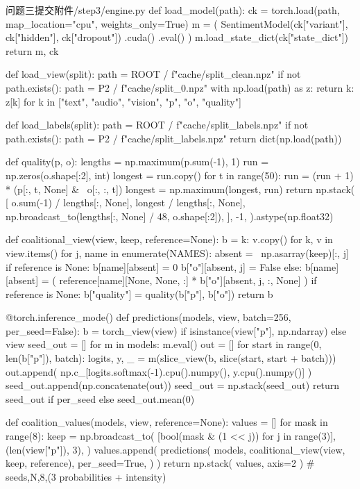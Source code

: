 \begin{appendices}
\begin{Python}{问题三提交附件/step3/engine.py}
def load_model(path):
    ck = torch.load(path, map_location="cpu", weights_only=True)
    m = (
        SentimentModel(ck["variant"], ck["hidden"], ck["dropout"])
        .cuda()
        .eval()
    )
    m.load_state_dict(ck["state_dict"])
    return m, ck


def load_view(split):
    path = ROOT / f"cache/{split}_clean.npz"
    if not path.exists():
        path = P2 / f"cache/{split}_0.npz"
    with np.load(path) as z:
        return {
            k: z[k]
            for k in ["text", "audio", "vision", "p", "o", "quality"]
        }


def load_labels(split):
    path = ROOT / f"cache/{split}_labels.npz"
    if not path.exists():
        path = P2 / f"cache/{split}_labels.npz"
    return dict(np.load(path))


def quality(p, o):
    lengths = np.maximum(p.sum(-1), 1)
    run = np.zeros(o.shape[:2], int)
    longest = run.copy()
    for t in range(50):
        run = (run + 1) * (p[:, t, None] & ~o[:, :, t])
        longest = np.maximum(longest, run)
    return np.stack(
        [
            o.sum(-1) / lengths[:, None],
            longest / lengths[:, None],
            np.broadcast_to(lengths[:, None] / 48, o.shape[:2]),
        ],
        -1,
    ).astype(np.float32)


def coalitional_view(view, keep, reference=None):
    b = {k: v.copy() for k, v in view.items()}
    for j, name in enumerate(NAMES):
        absent = ~np.asarray(keep)[:, j]
        if reference is None:
            b[name][absent] = 0
            b["o"][absent, j] = False
        else:
            b[name][absent] = (
                reference[name][None, None, :]
                * b["o"][absent, j, :, None]
            )
    if reference is None:
        b["quality"] = quality(b["p"], b["o"])
    return b


@torch.inference_mode()
def predictions(models, view, batch=256, per_seed=False):
    b = torch_view(view) if isinstance(view["p"], np.ndarray) else view
    seed_out = []
    for m in models:
        m.eval()
        out = []
        for start in range(0, len(b["p"]), batch):
            logits, y, _ = m(slice_view(b, slice(start, start + batch)))
            out.append(
                np.c_[logits.softmax(-1).cpu().numpy(), y.cpu().numpy()]
            )
        seed_out.append(np.concatenate(out))
    seed_out = np.stack(seed_out)
    return seed_out if per_seed else seed_out.mean(0)


def coalition_values(models, view, reference=None):
    values = []
    for mask in range(8):
        keep = np.broadcast_to(
            [bool(mask & (1 << j)) for j in range(3)],
            (len(view["p"]), 3),
        )
        values.append(
            predictions(
                models,
                coalitional_view(view, keep, reference),
                per_seed=True,
            )
        )
    return np.stack(
        values, axis=2
    )  # seeds,N,8,(3 probabilities + intensity)



\end{Python}
\end{appendices}
